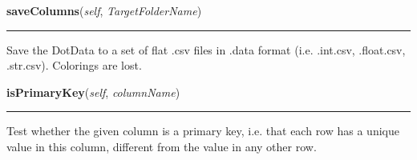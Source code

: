     \label{Classes:DotData:DotData:saveColumns}

    \vspace{0.5ex}

\hspace{.8\funcindent}\begin{boxedminipage}{\funcwidth}

    \raggedright \textbf{saveColumns}(\textit{self}, \textit{TargetFolderName})

    \vspace{-1.5ex}

    \rule{\textwidth}{0.5\fboxrule}
\setlength{\parskip}{2ex}
    Save the DotData to a set of flat .csv files in .data format (i.e. 
    .int.csv, .float.csv, .str.csv). Colorings are lost.

\setlength{\parskip}{1ex}
    \end{boxedminipage}

    \label{Classes:DotData:DotData:isPrimaryKey}

    \vspace{0.5ex}

\hspace{.8\funcindent}\begin{boxedminipage}{\funcwidth}

    \raggedright \textbf{isPrimaryKey}(\textit{self}, \textit{columnName})

    \vspace{-1.5ex}

    \rule{\textwidth}{0.5\fboxrule}
\setlength{\parskip}{2ex}
    Test whether the given column is a primary key, i.e. that each row has 
    a unique value in this column, different from the value in any other 
    row.

\setlength{\parskip}{1ex}
    \end{boxedminipage}

    \label{Classes:DotData:DotData:aggregate}

    \vspace{0.5ex}

